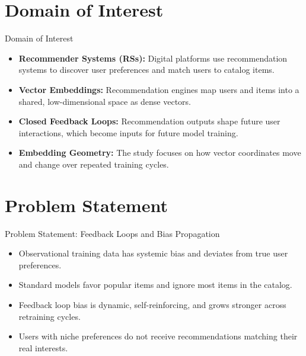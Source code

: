 \documentclass[11pt,aspectratio=43]{beamer}
\newcommand{\strong}[1]{\textbf{#1}}
\begin{document}
\section{Domain of Interest}
\begin{frame}{Domain of Interest}
  \begin{itemize}
    \item \strong{Recommender Systems (RSs):} Digital platforms use recommendation systems to discover user preferences and match users to catalog items.
    
    \item \strong{Vector Embeddings:} Recommendation engines map users and items into a shared, low-dimensional space as dense vectors.
    
    \item \strong{Closed Feedback Loops:} Recommendation outputs shape future user interactions, which become inputs for future model training.
    
    \item \strong{Embedding Geometry:} The study focuses on how vector coordinates move and change over repeated training cycles.
  \end{itemize}
\end{frame}

\section{Problem Statement}
\begin{frame}{Problem Statement: Feedback Loops and Bias Propagation}
  \begin{itemize}
    \item Observational training data has systemic bias and deviates from true user preferences.
    
    \item Standard models favor popular items and ignore most items in the catalog.
    
    \item Feedback loop bias is dynamic, self-reinforcing, and grows stronger across retraining cycles.
    
    \item Users with niche preferences do not receive recommendations matching their real interests.
  \end{itemize}
\end{frame}
\end{document}
